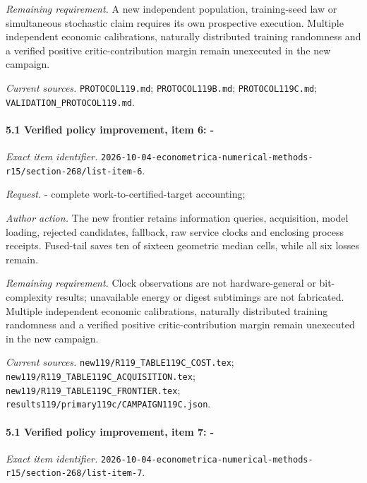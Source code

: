 \par\emph{Remaining requirement.} A new independent population, training-seed law or simultaneous stochastic claim requires its own prospective execution. Multiple independent economic calibrations, naturally distributed training randomness and a verified positive critic-contribution margin remain unexecuted in the new campaign.

\par\emph{Current sources.} \nolinkurl{PROTOCOL119.md}; \nolinkurl{PROTOCOL119B.md}; \nolinkurl{PROTOCOL119C.md}; \nolinkurl{VALIDATION_PROTOCOL119.md}.

\paragraph{5.1 Verified policy improvement, item 6: -}

\emph{Exact item identifier.} \nolinkurl{2026-10-04-econometrica-numerical-methods-r15/section-268/list-item-6}.

\par\emph{Request.} - complete work-to-certified-target accounting;

\par\emph{Author action.} The new frontier retains information queries, acquisition, model loading, rejected candidates, fallback, raw service clocks and enclosing process receipts. Fused-tail saves ten of sixteen geometric median cells, while all six losses remain.

\par\emph{Remaining requirement.} Clock observations are not hardware-general or bit-complexity results; unavailable energy or digest subtimings are not fabricated. Multiple independent economic calibrations, naturally distributed training randomness and a verified positive critic-contribution margin remain unexecuted in the new campaign.

\par\emph{Current sources.} \nolinkurl{new119/R119_TABLE119C_COST.tex}; \nolinkurl{new119/R119_TABLE119C_ACQUISITION.tex}; \nolinkurl{new119/R119_TABLE119C_FRONTIER.tex}; \nolinkurl{results119/primary119c/CAMPAIGN119C.json}.

\paragraph{5.1 Verified policy improvement, item 7: -}

\emph{Exact item identifier.} \nolinkurl{2026-10-04-econometrica-numerical-methods-r15/section-268/list-item-7}.

